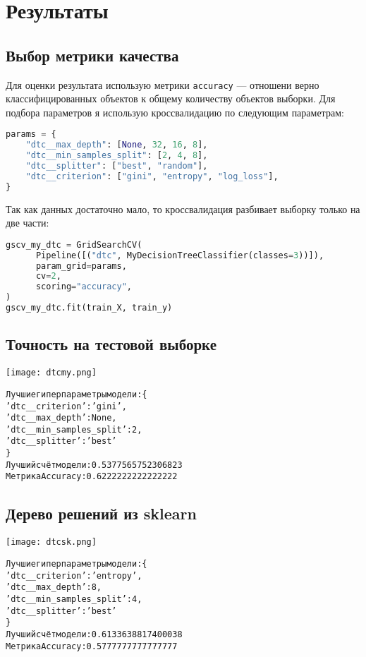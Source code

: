 \section{Результаты}
\subsection{Выбор метрики качества}
Для оценки результата использую метрики \texttt{accuracy} --- отношени верно классифицированных объектов к общему количеству объектов выборки. Для подбора параметров я использую кроссвалидацию по следующим параметрам:
\begin{lstlisting}[language=python, keepspaces=true]
params = {
    "dtc__max_depth": [None, 32, 16, 8],
    "dtc__min_samples_split": [2, 4, 8],
    "dtc__splitter": ["best", "random"],
    "dtc__criterion": ["gini", "entropy", "log_loss"],
}
\end{lstlisting}
Так как данных достаточно мало, то кроссвалидация разбивает выборку только на две части:
\begin{lstlisting}[language=python, keepspaces=true]
gscv_my_dtc = GridSearchCV(
      Pipeline([("dtc", MyDecisionTreeClassifier(classes=3))]),
      param_grid=params,
      cv=2,
      scoring="accuracy",
)
gscv_my_dtc.fit(train_X, train_y)
\end{lstlisting}
\pagebreak
\subsection{Точность на тестовой выборке}
\begin{center}
      \texttt{[image: dtcmy.png]}\newline\noindent
\end{center}
\begin{alltt}
      Лучшие гиперпараметры модели: \{
      'dtc__criterion': 'gini',
      'dtc__max_depth': None,
      'dtc__min_samples_split': 2,
      'dtc__splitter': 'best'
      \}
      Лучший счёт модели: 0.5377565752306823
      Метрика Accuracy: 0.6222222222222222
\end{alltt}
\pagebreak
\subsection{Дерево решений из sklearn}
\begin{center}
      \texttt{[image: dtcsk.png]}\newline\noindent
\end{center}
\begin{alltt}
      Лучшие гиперпараметры модели: \{
      'dtc__criterion': 'entropy',
      'dtc__max_depth': 8,
      'dtc__min_samples_split': 4,
      'dtc__splitter': 'best'
      \}
      Лучший счёт модели: 0.6133638817400038
      Метрика Accuracy: 0.5777777777777777
\end{alltt}
\pagebreak
